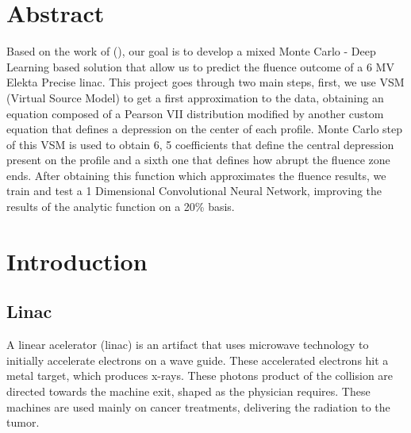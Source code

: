 \documentclass[openany]{article}
\begin{document}
\clearpage\thispagestyle{empty}\null\newpage %
	


\newpage
\thispagestyle{plain}
{
\hypersetup{hidelinks}
\tableofcontents
}

\newpage 

\listoffigures
\listoftables

\newpage 

\thispagestyle{empty}


\thispagestyle{plain}

\section{Abstract}

Based on the work of (\cite{Gonzalez2015}), our goal is to develop a mixed Monte Carlo - Deep Learning based solution that allow us to predict the fluence outcome of a 6 MV Elekta Precise linac. This project goes through two main steps, first, we use \cite{Fippel} VSM (Virtual Source Model) to get a first approximation to the data, obtaining an equation composed of a Pearson VII distribution modified by another custom equation that defines a depression on the center of each profile. Monte Carlo step of this VSM is used to obtain 6, 5 coefficients that define the central depression present on the profile and a sixth one that defines how abrupt the fluence zone ends. After obtaining this function which approximates the fluence results, we train and test a 1 Dimensional Convolutional Neural Network, improving the results of the analytic function on a 20\% basis.

    \vspace{2cm}
    





\newpage

\section{Introduction} \label{sec: introduction}

\subsection{Linac}


A linear acelerator (linac) is an artifact that uses microwave technology to initially accelerate electrons on a wave guide. These accelerated electrons hit a metal target, which produces x-rays. These photons product of the collision are directed towards the machine exit, shaped as the physician requires. These machines are used mainly on cancer treatments, delivering the radiation to the tumor.
\end{document}
